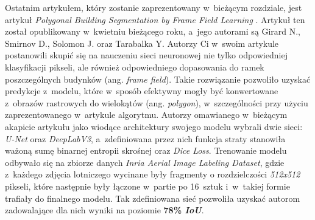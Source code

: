 Ostatnim artykułem, który zostanie zaprezentowany w~bieżącym rozdziale, jest artykuł \emph{Polygonal Building Segmentation by Frame Field Learning} \cite{girard}. Artykuł ten został opublikowany w~kwietniu bieżącego roku, a~jego autorami są Girard N., Smirnov D., Solomon J. oraz Tarabalka Y. Autorzy Ci w~swoim artykule postanowili skupić się na nauczeniu sieci neuronowej nie tylko odpowiedniej klasyfikacji pikseli, ale również odpowiedniego dopasowania do ramek poszczególnych budynków (ang. \emph{frame field}). Takie rozwiązanie pozwoliło uzyskać predykcje z~modelu, które w~sposób efektywny mogły być konwertowane z~obrazów rastrowych do wielokątów (ang. \emph{polygon}), w~szczególności przy użyciu zaprezentowanego w~artykule algorytmu. Autorzy omawianego w~bieżącym akapicie artykułu jako wiodące architektury swojego modelu wybrali dwie sieci: \emph{U-Net} oraz \emph{DeepLabV3}, a~zdefiniowana przez nich funkcja straty stanowiła ważoną sumę binarnej entropii skrośnej oraz \emph{Dice Loss}. Trenowanie modelu odbywało się na zbiorze danych \emph{Inria Aerial Image Labeling Dataset}, gdzie z~każdego zdjęcia lotniczego wycinane były fragmenty o rozdzielczości  \emph{512x512} pikseli, które następnie były łączone w~partie po 16~sztuk i~w~takiej formie trafiały do finalnego modelu. Tak zdefiniowana sieć pozwoliła uzyskać autorom zadowalające dla nich wyniki na poziomie \textbf{78\% \emph{IoU}}.

